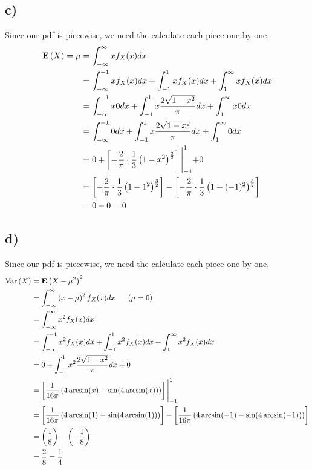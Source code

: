 \subsection*{c)}

Since our pdf is piecewise, we need the calculate each piece one by one,
\begin{align*}
    \mathbf{E}\left(X\right) = \mu &= \int_{-\infty}^{\infty} x f_X(x) dx\\
                        &= \int_{-\infty}^{-1} x f_X(x) dx + \int_{-1}^{1} x f_X(x) dx + \int_{1}^{\infty} x f_X(x) dx\\
                        &= \int_{-\infty}^{-1} x 0 dx + \int_{-1}^{1} x \dfrac{2\sqrt{1-x^2}}{\pi} dx + \int_{1}^{\infty} x 0 dx\\
                        &= \int_{-\infty}^{-1} 0 dx + \int_{-1}^{1} x \dfrac{2\sqrt{1-x^2}}{\pi} dx + \int_{1}^{\infty} 0 dx\\
                        &= 0 + \left[ -\frac{2}{\pi} \cdot \frac{1}{3} \left( 1 - x^2 \right)^{\frac{3}{2}} \right]\Biggl|_{-1}^{1} + 0\\
                        &= \left[ -\frac{2}{\pi} \cdot \frac{1}{3} \left( 1 - 1^2 \right)^{\frac{3}{2}} \right] - \left[ -\frac{2}{\pi} \cdot \frac{1}{3} \left( 1 - (-1)^2 \right)^{\frac{3}{2}} \right]\\
                        &= 0 - 0 = 0
\end{align*}

\subsection*{d)}

Since our pdf is piecewise, we need the calculate each piece one by one,
\begin{align*}
    \text{Var}\left( X \right) &= \mathbf{E}\left(X - \mu^2\right)^2\\
            &= \int_{-\infty}^{\infty} \left( x - \mu \right)^2 f_X(x) dx\ \ \ \ \ (\mu = 0)\\
            &= \int_{-\infty}^{\infty} x^2 f_X(x) dx\\
            &= \int_{-\infty}^{-1} x^2 f_X(x) dx + \int_{-1}^{1} x^2 f_X(x) dx + \int_{1}^{\infty} x^2 f_X(x) dx\\
            &= 0 + \int_{-1}^{1} x^2 \dfrac{2\sqrt{1-x^2}}{\pi} dx + 0\\
            &= \left[ \frac{1}{16\pi} \left( 4 \arcsin(x) - \sin(4\arcsin(x)) \right) \right] \Biggl|_{-1}^{1}\\
            &= \left[ \frac{1}{16\pi} \left( 4 \arcsin(1) - \sin(4\arcsin(1)) \right) \right] - \left[ \frac{1}{16\pi} \left( 4 \arcsin(-1) - \sin(4\arcsin(-1)) \right) \right]\\
            &= \left( \frac{1}{8} \right) - \left( -\frac{1}{8} \right)\\
            &= \frac{2}{8} = \frac{1}{4}
\end{align*}
